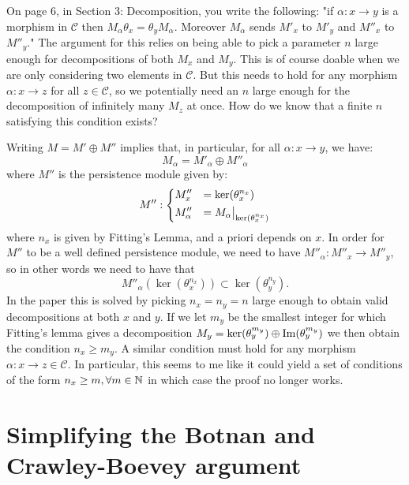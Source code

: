 On page 6, in Section 3: Decomposition, you write the following: "if $\alpha : x \rightarrow y$ is a morphism in $\mathcal{C}$ then $M_{\alpha} \theta_x = \theta_y M_{\alpha}$. Moreover $M_{\alpha}$ sends $M'_x$ to $M'_y$ and $M''_x$ to $M''_y$."
The argument for this relies on being able to pick a parameter $n$ large enough for decompositions of both $M_x$ and $M_y$. 
This is of course doable when we are only considering two elements in $\mathcal{C}$. But this needs to hold for any 
morphism $\alpha : x \rightarrow z$ for all $z \in \mathcal{C}$, so we potentially need an $n$ large enough for the decomposition of 
infinitely many $M_z$ at once. How do we know that a finite $n$ satisfying this condition exists?  

\newpage 

Writing $M = M' \oplus M''$ implies that, in particular, for all $\alpha : x \rightarrow y$, we have:
\begin{equation*}
	M_{\alpha} = M'_{\alpha} \oplus M''_{\alpha}
\end{equation*}
where $M''$ is the persistence module given by: 
\begin{equation*}
	 M'' : 
	\begin{dcases}
		M''_x &= \ker (\theta_x^{n_x}) \\
		M''_{\alpha} &= \restr{M_{\alpha}}{ \ker (\theta_x^{n_x})}  
	\end{dcases}
\end{equation*}
where $n_x$ is given by Fitting's Lemma, and a priori depends on $x$. 
In order for $M''$ to be a well defined persistence module, we need to have $M''_{\alpha} : 	M''_x \rightarrow 	M''_y$, so in other words we need to have that 
\begin{equation*}
	M''_{\alpha} (\ker (\theta_x^{n_x})) \subset \ker (\theta_y^{n_y}).
\end{equation*}
In the paper this is solved by picking $n_x = n_y = n$ large enough to obtain valid decompositions at both $x$ and $y$. If we let $m_y$ be the smallest integer for which Fitting's lemma gives a decomposition $M_y = \ker (\theta_y^{m_y}) \oplus \operatorname{Im} (\theta_y^{m_y})$ we then obtain the condition $n_x \geq m_y$. 
A similar condition must hold for any morphism $\alpha : x \rightarrow z \in \mathcal{C}$. In particular, this seems to me like it could yield a set of conditions of the form $n_x \geq m, \forall m \in \mathbb{N}$ in which case the proof no longer works.


\section{Simplifying the Botnan and Crawley-Boevey argument}

